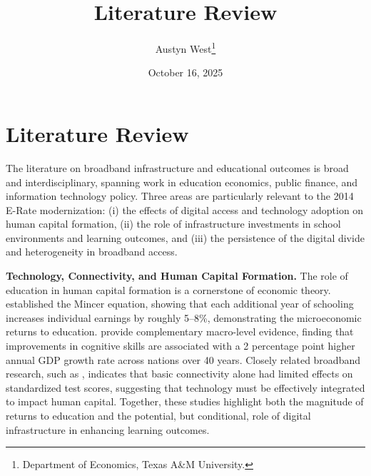 


\begin{singlespace}
\title{Literature Review}
\author{Austyn West\thanks{Department of Economics, Texas A\&M University.}}
\date{October 16, 2025}
\maketitle
\end{singlespace}


\section*{Literature Review}

The literature on broadband infrastructure and educational outcomes is broad and interdisciplinary, spanning work in education economics, public finance, and information technology policy. Three areas are particularly relevant to the 2014 E-Rate modernization: (i) the effects of digital access and technology adoption on human capital formation, (ii) the role of infrastructure investments in school environments and learning outcomes, and (iii) the persistence of the digital divide and heterogeneity in broadband access.

\textbf{Technology, Connectivity, and Human Capital Formation.} The role of education in human capital formation is a cornerstone of economic theory. \citet{mincer1974} established the Mincer equation, showing that each additional year of schooling increases individual earnings by roughly 5–8\%, demonstrating the microeconomic returns to education. \citet{hanushek2012} provide complementary macro-level evidence, finding that improvements in cognitive skills are associated with a 2 percentage point higher annual GDP growth rate across nations over 40 years. Closely related broadband research, such as \citet{hazlett2019}, indicates that basic connectivity alone had limited effects on standardized test scores, suggesting that technology must be effectively integrated to impact human capital. Together, these studies highlight both the magnitude of returns to education and the potential, but conditional, role of digital infrastructure in enhancing learning outcomes.


